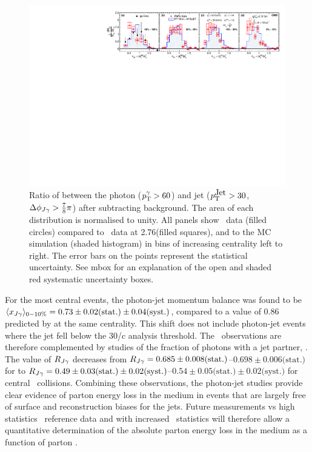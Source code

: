 \begin{figure}[!h]
\begin{center}
\includegraphics[width=0.98\mboxwidth]{jetfigures/Photonv7_Paper_InclPtRatio_all_cent4_G60J30_subDPhi1SS1_Isol0_Norm1log1.pdf}
\caption[]{\label{fig:GR:InclPtRatio_qcdPhoRef_pp2760-xJ30G60} Ratio of \pt{} between the
  photon ($p_{\rm{T}}^{\gamma} > 60$\GeVc) and jet ($p_{\rm{T}}^{\mbox{Jet}} > 30$\GeVc, $\Delta\phi_{J\gamma} > \frac{7}{8}\pi$)
  after subtracting background. The area of each distribution is normalised to unity. All panels show
\PbPb\ data (filled circles) compared to \pp\ data at
  2.76\TeV (filled squares), and to the \PYTHYD{} MC simulation
  (shaded histogram) in bins of increasing centrality left to right. The error bars
  on the points represent the statistical uncertainty.
  See mbox for an explanation of the open and shaded red systematic
  uncertainty boxes.
}
\label{fig:GR:CMS_xjg}
\end{center}
\end{figure}

For the most central events, the  photon-jet momentum balance  was found to be
$\langle x_{J\gamma}\rangle_{0-10\%} = 0.73 \pm 0.02 \mbox{(stat.)} \pm 0.04 \mbox{(syst.)}$, compared
to a value of 0.86 predicted by \PYTHYD{} at the same centrality. This shift does
not include photon-jet events where the jet fell below the 30\GeV/c analysis threshold. 
The \xjg\ observations are therefore complemented by studies of the fraction of 
photons with a jet partner, \rjg.  The value of $R_{J\gamma}$ decreases
from $R_{J\gamma} = 0.685\pm 0.008\mbox{(stat.)}$--$0.698\pm 0.006\mbox{(stat.)}$ for \PYTHYD{}
to  $R_{J\gamma} = 0.49\pm 0.03\mbox{(stat.)}\pm 0.02\mbox{(syst.)}$--$0.54\pm 0.05\mbox{(stat.)}\pm 0.02\mbox{(syst.)}$ for
central \PbPb\ collisions. Combining these observations, the photon-jet studies 
provide clear evidence of parton energy loss in the medium in events that are 
largely free of surface and reconstruction biases for the jets. Future measurements 
vs high statistics \pp\ reference data and with increased \PbPb\ statistics will
therefore allow a quantitative determination of the absolute parton energy loss
in the medium as a function of parton \pt.

